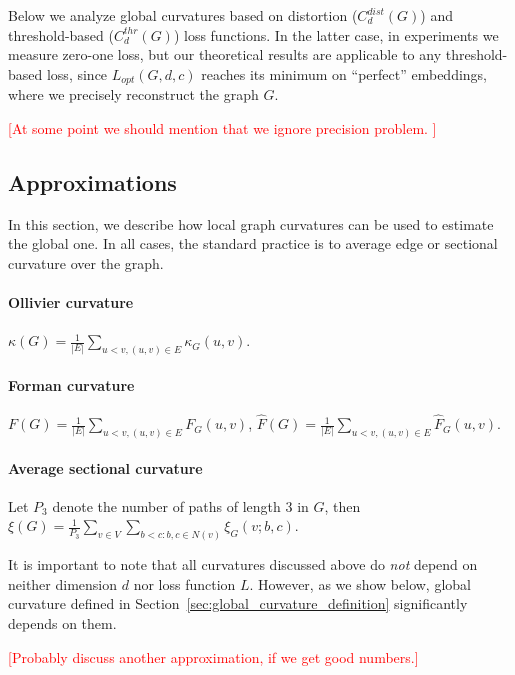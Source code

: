 \documentclass{article} %
\begin{document}
Below we analyze global curvatures based on distortion ($C_d^{dist}(G)$) and threshold-based ($C_d^{thr}(G)$) loss functions. 
In the latter case, in experiments we measure zero-one loss, but our theoretical results are applicable to any threshold-based loss, since 
$L_{opt}(G,d,c)$ reaches its minimum on ``perfect'' embeddings, where we precisely reconstruct the graph $G$.

\textcolor{red}{[At some point we should mention that we ignore precision problem. ]}

\subsection{Approximations}

In this section, we describe how local graph curvatures can be used to estimate the global one. In all cases, the standard practice is to average edge or sectional curvature over the graph.

\paragraph{Ollivier curvature} $\kappa(G) = \frac{1}{|E|}\sum\limits_{u < v, (u,v) \in E} \kappa_G(u,v)$.

\paragraph{Forman curvature} $F(G) = \frac{1}{|E|}\sum\limits_{u < v, (u,v) \in E} F_G(u,v)$, $\hat F(G) = \frac{1}{|E|}\sum\limits_{u < v, (u,v) \in E} \hat F_G(u,v)$.

\paragraph{Average sectional curvature} Let $P_3$ denote the number of paths of length 3 in $G$, then $\xi(G) = \frac{1}{P_3} \sum\limits_{v \in V }\sum\limits_{b<c: b,c\in N(v)} \xi_G(v;b,c)$.

It is important to note that all curvatures discussed above do \textit{not} depend on neither dimension $d$ nor loss function $L$. However, as we show below, global curvature defined in Section~\ref{sec:global_curvature_definition} significantly depends on them.

\textcolor{red}{[Probably discuss another approximation, if we get good numbers.]}
\end{document}
